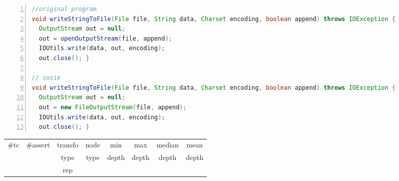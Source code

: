 \begin{minipage}{\columnwidth}
\begin{lstlisting}[caption={\texttt{writeStringToFile} in commons.io},language=java,numbers=left]
//original program
void writeStringToFile(File file, String data, Charset encoding, boolean append) throws IOException {
  OutputStream out = null;
  out = openOutputStream(file, append); 
  IOUtils.write(data, out, encoding);
  out.close(); }

// sosie  
void writeStringToFile(File file, String data, Charset encoding, boolean append) throws IOException {
  OutputStream out = null;
  out = new FileOutputStream(file, append);
  IOUtils.write(data, out, encoding);
  out.close(); }
\end{lstlisting}
\tabcolsep=0.11cm
\begin{tabular}{>{\small}c>{\small}c>{\small}c>{\small}c>{\small}c>{\small}c>{\small}c>{\small}c}
\hline
\rowcolor{lightgray} \#tc & \#assert & transfo & node & min & max & median & mean   \\
\rowcolor{lightgray}  & & type & type & depth  & depth & depth & depth  \\ 
\hline
 &  & rep &  &  &  &  & \\
\hline
\end{tabular}
\end{minipage}
